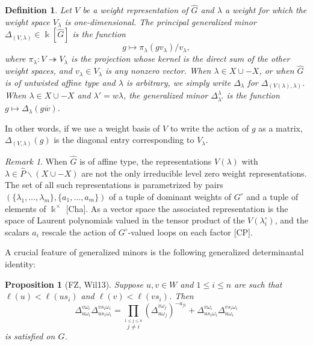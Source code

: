 \documentclass[12pt]{amsart}
\newcommand{\sayHW}[1]{\say[HW]{\color{violet}{\bf HW:}\;#1}}
\newcommand{\kk}{\Bbbk}%
\newcommand\onto{\twoheadrightarrow}
\newcommand{\ol}[1]{\overline{#1}}
\newtheorem{definition}[theorem]{Definition}
\newtheorem{proposition}[theorem]{Proposition}
\theoremstyle{remark}
\newtheorem{remark}[theorem]{Remark}
\numberwithin{equation}{section}
\begin{document}
\begin{definition}
Let $V$ be a weight representation of $\widehat{G}$ and $\lambda$ a weight for which the weight space $V_\lambda$ is one-dimensional. The principal generalized minor $\Delta_{(V,\lambda)} \in \kk[\widehat{G}]$ is the function 
\[
g \mapsto \pi_\lambda(gv_\lambda)/v_\lambda,
\]
where $\pi_\lambda:V \onto V_\lambda$ is the projection whose kernel is the direct sum of the other weight spaces, and $v_\lambda \in V_\lambda$ is any nonzero vector. When $\lambda \in X \cup -X$, or when $\widehat{G}$ is of untwisted affine type and $\lambda$ is arbitrary, we simply write $\Delta_\lambda$ for $\Delta_{(V(\lambda),\lambda)}$. When $\lambda \in X \cup -X$ and $\lambda' = w \lambda$, the generalized minor $\Delta^{\lambda}_{\lambda'}$ is the function $g \mapsto \Delta_\lambda(g\ol{w})$. \sayHW{Check the exact formula} 
\end{definition}

In other words, if we use a weight basis of $V$ to write the action of $g$ as a matrix, $\Delta_{(V,\lambda)}(g)$ is the diagonal entry corresponding to $V_\lambda$. 

\begin{remark}
When $\widehat{G}$ is of affine type, the representations $V(\lambda)$ with $\lambda \in \widehat{P}\smallsetminus(X \cup - X)$ are not the only irreducible level zero weight representations. The set of all such representations is parametrized by pairs $(\{\lambda_1,\dotsc,\lambda_m\},\{a_1,\dotsc,a_m\})$ of a tuple of dominant weights of $G^\circ$ and a tuple of elements of $\kk^\times$ [Cha]. As a vector space the associated representation is the space of Laurent polynomials valued in the tensor product of the $V(\lambda_i^\circ)$, and the scalars $a_i$ rescale the action of $G^\circ$-valued loops on each factor [CP].
\end{remark}

A crucial feature of generalized minors is the following generalized determinantal identity:

\begin{proposition}[FZ, Wil13]
  \label{prop:fundid}
  Suppose $u,v \in W$ and $1 \leq i \leq n$ are such that $\ell(u)<\ell(us_i)$ and $\ell(v)<\ell(vs_i)$. 
  Then 
  \begin{equation}
    \label{eq:fundid}
    \Delta_{u\omega_i}^{v\omega_i} \Delta_{us_i\omega_i}^{vs_i\omega_i} 
    =
    \prod_{\stackrel{1\leq j \leq n}{j\neq i}}\left(\Delta_{u\omega_j}^{v\omega_j}\right)^{-a_{ji}}
    +
    \Delta_{us_i\omega_i}^{v\omega_i} \Delta_{u\omega_i}^{vs_i\omega_i}
  \end{equation}
is satisfied on $G$.
\end{proposition}
\end{document}
